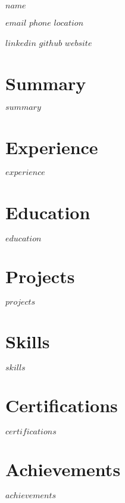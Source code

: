 \documentclass[a4paper,10pt]{article}
\newcommand{\name}{$name$}
\newcommand{\email}{$email$}
\newcommand{\phone}{$phone$}
\newcommand{\linkedin}{$linkedin$}
\newcommand{\github}{$github$}
\newcommand{\location}{$location$}
\newcommand{\website}{$website$}
\begin{document}
\pagestyle{empty}

{\LARGE\textbf{\name}}

\vspace{0.3em}
{\small
{} \href{mailto:\email}{\email} \textbullet{} 
 \phone \textbullet{} 
 \location

 \href{https://linkedin.com/in/\linkedin}{\linkedin} \textbullet{} 
 \href{https://github.com/\github}{\github} \textbullet{} 
\href{\website}{\website}
}

\vspace{1em}

\section*{Summary}
$summary$

\section*{Experience}
$experience$

\section*{Education}
$education$

\section*{Projects}
$projects$

\section*{Skills}
$skills$

\section*{Certifications}
$certifications$

\section*{Achievements}
$achievements$
\end{document}
